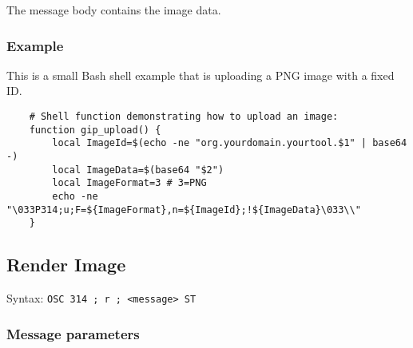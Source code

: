 \documentclass[a4paper]{article}
\newcommand{\code}[1]{\colorbox{light-gray}{\texttt{#1}}}
\begin{document}
The message body contains the image data.

\subsubsection*{Example}

This is a small Bash shell example that is uploading a PNG image with a fixed ID.

\begin{verbatim}
    # Shell function demonstrating how to upload an image:
    function gip_upload() {
        local ImageId=$(echo -ne "org.yourdomain.yourtool.$1" | base64 -)
        local ImageData=$(base64 "$2")
        local ImageFormat=3 # 3=PNG
        echo -ne "\033P314;u;F=${ImageFormat},n=${ImageId};!${ImageData}\033\\"
    }
\end{verbatim}

\pagebreak

\subsection{Render Image} %

Syntax: \code{OSC 314 ; r ; <message> ST}

\subsubsection*{Message parameters}
\end{document}
